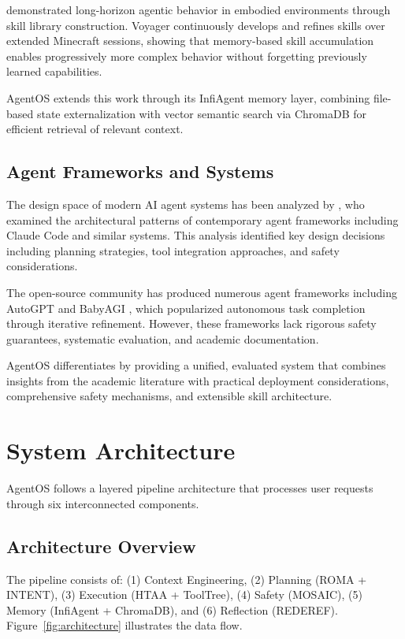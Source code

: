 \documentclass{article}
\begin{document}
\citet{wang2023voyager} demonstrated long-horizon agentic behavior in embodied environments through skill library construction. Voyager continuously develops and refines skills over extended Minecraft sessions, showing that memory-based skill accumulation enables progressively more complex behavior without forgetting previously learned capabilities.

AgentOS extends this work through its InfiAgent memory layer, combining file-based state externalization with vector semantic search via ChromaDB for efficient retrieval of relevant context.

\subsection{Agent Frameworks and Systems}

The design space of modern AI agent systems has been analyzed by \citet{liu2026claudecode}, who examined the architectural patterns of contemporary agent frameworks including Claude Code and similar systems. This analysis identified key design decisions including planning strategies, tool integration approaches, and safety considerations.

The open-source community has produced numerous agent frameworks including AutoGPT \citep{autogpt2023} and BabyAGI \citep{babyagi2023}, which popularized autonomous task completion through iterative refinement. However, these frameworks lack rigorous safety guarantees, systematic evaluation, and academic documentation.

AgentOS differentiates by providing a unified, evaluated system that combines insights from the academic literature with practical deployment considerations, comprehensive safety mechanisms, and extensible skill architecture.

\section{System Architecture}

AgentOS follows a layered pipeline architecture that processes user requests through six interconnected components.

\subsection{Architecture Overview}

The pipeline consists of: (1) Context Engineering, (2) Planning (ROMA + INTENT), (3) Execution (HTAA + ToolTree), (4) Safety (MOSAIC), (5) Memory (InfiAgent + ChromaDB), and (6) Reflection (REDEREF). Figure~\ref{fig:architecture} illustrates the data flow.
\end{document}
